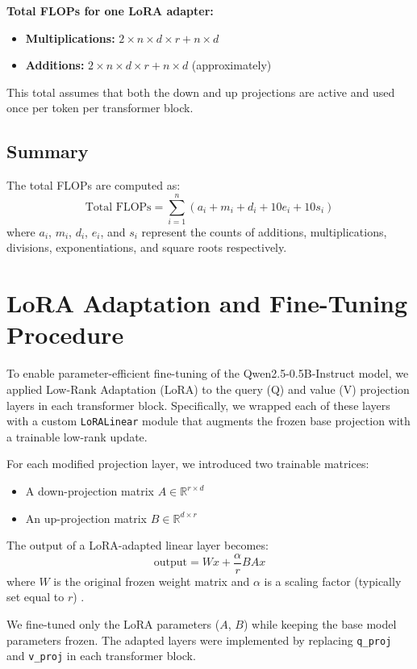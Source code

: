 \documentclass[a4paper,12pt]{article}
\begin{document}
\textbf{Total FLOPs for one LoRA adapter:}
\begin{itemize}
  \item \textbf{Multiplications:} $2 \times n \times d \times r + n \times d$
  \item \textbf{Additions:} $2 \times n \times d \times r + n \times d$ (approximately)
\end{itemize}
This total assumes that both the down and up projections are active and used once per token per transformer block.


\subsection*{Summary}

The total FLOPs are computed as:
\[
\text{Total FLOPs} = \sum_{i=1}^{n} \left( a_i + m_i + d_i + 10e_i + 10s_i \right)
\]
where $a_i$, $m_i$, $d_i$, $e_i$, and $s_i$ represent the counts of additions, multiplications, divisions, exponentiations, and square roots respectively.

\section{LoRA Adaptation and Fine-Tuning Procedure}

To enable parameter-efficient fine-tuning of the Qwen2.5-0.5B-Instruct model, we applied Low-Rank Adaptation (LoRA) to the query (Q) and value (V) projection layers in each transformer block. Specifically, we wrapped each of these layers with a custom \texttt{LoRALinear} module that augments the frozen base projection with a trainable low-rank update.

For each modified projection layer, we introduced two trainable matrices:
\begin{itemize}
    \item A down-projection matrix $A \in \mathbb{R}^{r \times d}$
    \item An up-projection matrix $B \in \mathbb{R}^{d \times r}$
\end{itemize}

The output of a LoRA-adapted linear layer becomes:
\[
\text{output} = W x + \frac{\alpha}{r} B A x
\]
where $W$ is the original frozen weight matrix and $\alpha$ is a scaling factor (typically set equal to $r$) \citep{hu2021lora}.

We fine-tuned only the LoRA parameters ($A$, $B$) while keeping the base model parameters frozen. The adapted layers were implemented by replacing \texttt{q\_proj} and \texttt{v\_proj} in each transformer block.
\end{document}

